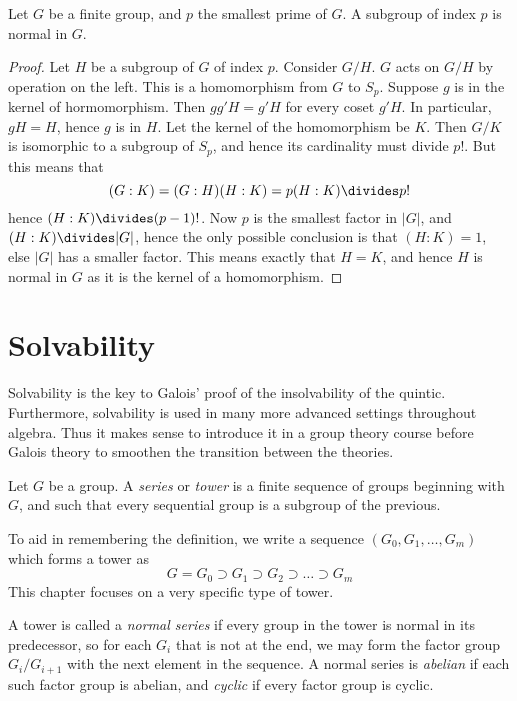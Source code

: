 \begin{theorem}
    Let $G$ be a finite group, and $p$ the smallest prime of $G$. A subgroup of index $p$ is normal in $G$.
\end{theorem}
\begin{proof}
    Let $H$ be a subgroup of $G$ of index $p$. Consider $G/H$. $G$ acts on $G/H$ by operation on the left. This is a homomorphism from $G$ to $S_p$. Suppose $g$ is in the kernel of hormomorphism. Then $gg'H = g'H$ for every coset $g'H$. In particular, $gH = H$, hence $g$ is in $H$. Let the kernel of the homomorphism be $K$. Then $G/K$ is isomorphic to a subgroup of $S_p$, and hence its cardinality must divide $p!$. But this means that
    \[ (G:K) = (G:H)(H:K) = p(H:K) \divides p! \]
    hence $(H:K) \divides (p-1)!$. Now $p$ is the smallest factor in $|G|$, and $(H:K) \divides |G|$, hence the only possible conclusion is that $(H:K) = 1$, else $|G|$ has a smaller factor. This means exactly that $H = K$, and hence $H$ is normal in $G$ as it is the kernel of a homomorphism.
\end{proof}









\chapter{Solvability}

Solvability is the key to Galois' proof of the insolvability of the quintic. Furthermore, solvability is used in many more advanced settings throughout algebra. Thus it makes sense to introduce it in a group theory course before Galois theory to smoothen the transition between the theories.

Let $G$ be a group. A \emph{series}  or \emph{tower}  is a finite sequence of groups beginning with $G$, and such that every sequential group is a subgroup of the previous.

To aid in remembering the definition, we write a sequence $(G_0, G_1, \dots, G_m)$ which forms a tower as
%
\[ G = G_0 \supset G_1 \supset G_2 \supset \dots \supset G_m \]
%
This chapter focuses on a very specific type of tower.

A tower is called a \emph{normal series} if every group in the tower is normal in its predecessor, so for each $G_i$ that is not at the end, we may form the factor group $G_i/G_{i+1}$ with the next element in the sequence. A normal series is \emph{abelian} if each such factor group is abelian, and \emph{cyclic}  if every factor group is cyclic.

